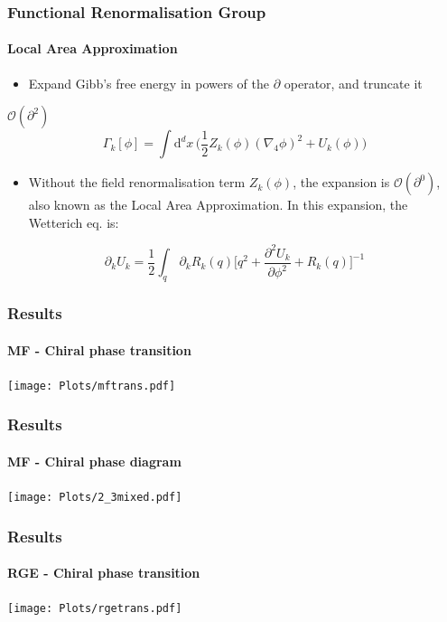 \documentclass[10pt,a4paper,usenames,dvipsnames]{beamer}
\begin{document}
\begin{frame}
  \frametitle{Functional Renormalisation Group}
  \framesubtitle{Local Area Approximation}

  \begin{itemize}
    \item Expand Gibb's free energy in powers of the $\partial$ operator, and truncate it
  \end{itemize}

  \begin{block}{$\mathcal{O}(\partial^2)$}
    \begin{equation*}
      \Gamma_k[\phi] = \int \mathrm{d}^d x \, \Big( \frac{1}{2}Z_k(\phi)(\nabla_4 \phi)^2 + U_k(\phi) \Big)
    \end{equation*}
  \end{block}

  \begin{itemize}
    \item Without the field renormalisation term $Z_k(\phi)$, the expansion is $\mathcal{O}(\partial^0)$, also known as the Local
      Area Approximation. In this expansion, the Wetterich eq. is:
  \end{itemize}

  \begin{block}{}
    \begin{equation*}
      \partial_k U_k = \frac{1}{2} \int_q \, \partial_k R_k(q) \bigg[ q^2 + \frac{\partial^2 U_k}{\partial\phi^2} +
      R_k(q)\bigg]^{-1}
    \end{equation*}
  \end{block}
\end{frame}

\begin{frame}
  \frametitle{Results}
  \framesubtitle{MF - Chiral phase transition}

  {\centering
    \texttt{[image: Plots/mftrans.pdf]}
   \par}
\end{frame}

\begin{frame}
  \frametitle{Results}
  \framesubtitle{MF - Chiral phase diagram}

  {\centering
    \texttt{[image: Plots/2\_3mixed.pdf]}
   \par}
\end{frame}

\begin{frame}
  \frametitle{Results}
  \framesubtitle{RGE - Chiral phase transition}

  {\centering
    \texttt{[image: Plots/rgetrans.pdf]}
   \par}
\end{frame}
\end{document}
